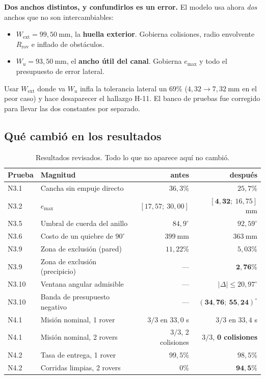 \documentclass[11pt,a4paper]{article}
\newcommand{\grados}{^{\circ}}
\begin{document}
\begin{tcolorbox}[colback=black!5,colframe=black!65,boxrule=0.7pt,arc=1pt]
\textbf{Dos anchos distintos, y confundirlos es un error.} El modelo usa ahora
\emph{dos} anchos que no son intercambiables:
\begin{itemize}[leftmargin=1.6em,itemsep=2pt,topsep=3pt]
\item $W_{\mathrm{ext}} = 99{,}50\ \mathrm{mm}$, la \textbf{huella exterior}. Gobierna
      colisiones, radio envolvente $R_{\mathrm{rov}}$ e inflado de obstáculos.
\item $W_u = 93{,}50\ \mathrm{mm}$, el \textbf{ancho útil del canal}. Gobierna
      $e_{\max}$ y todo el presupuesto de error lateral.
\end{itemize}
Usar $W_{\mathrm{ext}}$ donde va $W_u$ infla la tolerancia lateral un $69\%$
($4{,}32 \to 7{,}32\ \mathrm{mm}$ en el peor caso) y hace desaparecer el hallazgo H-11.
El banco de pruebas fue corregido para llevar las dos constantes por separado.
\end{tcolorbox}

\subsection{Qué cambió en los resultados}

\begin{table}[htbp]
\centering
\small
\caption{Resultados revisados. Todo lo que no aparece aquí no cambió.}
\begin{tabular}{llrr}
\toprule
Prueba & Magnitud & antes & después \\
\midrule
N3.1 & Cancha sin empuje directo & $36{,}3\%$ & $25{,}7\%$ \\
N3.2 & $e_{\max}$ & $[17{,}57;\ 30{,}00]$ & $[\mathbf{4{,}32};\ 16{,}75]$ mm \\
N3.5 & Umbral de cuerda del anillo & $84{,}9\grados$ & $92{,}59\grados$ \\
N3.6 & Costo de un quiebre de $90\grados$ & $399\ \mathrm{mm}$ & $363\ \mathrm{mm}$ \\
N3.9 & Zona de exclusión (pared) & $11{,}22\%$ & $5{,}03\%$ \\
N3.9 & Zona de exclusión (precipicio) & --- & $\mathbf{2{,}76\%}$ \\
N3.10 & Ventana angular admisible & --- & $|\Delta| \le 20{,}97\grados$ \\
N3.10 & Banda de presupuesto negativo & --- & $\mathbf{(34{,}76;\ 55{,}24)\grados}$ \\
N4.1 & Misión nominal, 1 rover & $3/3$ en $33{,}0$ s & $3/3$ en $33{,}4$ s \\
N4.1 & Misión nominal, 2 rovers & $3/3$, 2 colisiones & $3/3$, \textbf{0 colisiones} \\
N4.2 & Tasa de entrega, 1 rover & $99{,}5\%$ & $98{,}5\%$ \\
N4.2 & Corridas limpias, 2 rovers & $0\%$ & $\mathbf{94{,}5\%}$ \\
\bottomrule
\end{tabular}
\end{table}
\end{document}
